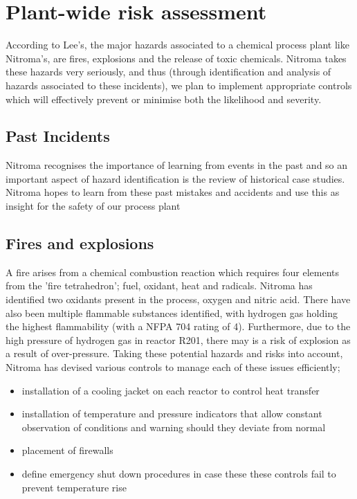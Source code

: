 \section{Plant-wide risk assessment}

According to Lee’s, the major hazards associated to a chemical process plant like Nitroma’s, are fires, explosions and the release of toxic chemicals. Nitroma takes these hazards very seriously, and thus (through identification and analysis of hazards associated to these incidents), we plan to implement appropriate controls which will effectively prevent or minimise both the likelihood and severity. 

\subsection{Past Incidents}

Nitroma recognises the importance of learning from events in the past and so an important aspect of hazard identification is the review of historical case studies. Nitroma hopes to learn from these past mistakes and accidents and use this as insight for the safety of our process plant


\subsection{Fires and explosions}

A fire arises from a chemical combustion reaction which requires four elements from the 'fire tetrahedron'; fuel, oxidant, heat and radicals. Nitroma has identified two oxidants present in the process, oxygen and nitric acid. There have also been multiple flammable substances identified, with hydrogen gas holding the highest flammability (with a NFPA 704 rating of 4). Furthermore, due to the high pressure of hydrogen gas in reactor R201, there may is a risk of explosion as a result of over-pressure. Taking these potential hazards and risks into account, Nitroma has devised various controls to manage each of these issues efficiently; 

\begin{itemize}
    \item installation of a cooling jacket on each reactor to control heat transfer
    \item installation of temperature and pressure indicators that allow constant observation of conditions and warning should they deviate from normal
    \item placement of firewalls 
    \item define emergency shut down procedures in case these these controls fail to prevent temperature rise
\end{itemize}


